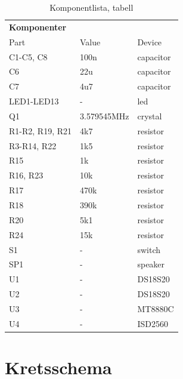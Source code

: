 \documentclass[a4paper,11pt]{article}
\begin{document}
	\begin{table} [H]
	\caption{Komponentlista, tabell} 
	\label{tab:komponentlista}
	\begin{tabular}{l l l}
		
		{\bf Komponenter}
		\\{Part} & {Value} & {Device}\\
		\hline
C1-C5, C8 & 100n & capacitor \\
C6 & 22u & capacitor \\
C7 & 4u7 & capacitor \\
LED1-LED13 & - & led \\
Q1 & 3.579545MHz & crystal \\
R1-R2, R19, R21 & 4k7 & resistor \\
R3-R14, R22 & 1k5 & resistor \\
R15 & 1k & resistor \\
R16, R23 & 10k & resistor \\
R17 & 470k & resistor \\
R18 & 390k & resistor \\
R20 & 5k1 & resistor \\
R24 & 15k & resistor \\
S1 & - & switch \\
SP1 & - & speaker \\
U1 & - & DS18S20 \\
U2 & - & DS18S20 \\
U3 & - & MT8880C \\
U4 & - & ISD2560 

	\end{tabular}
	\end{table}

	\section{Kretsschema}
\end{document}
